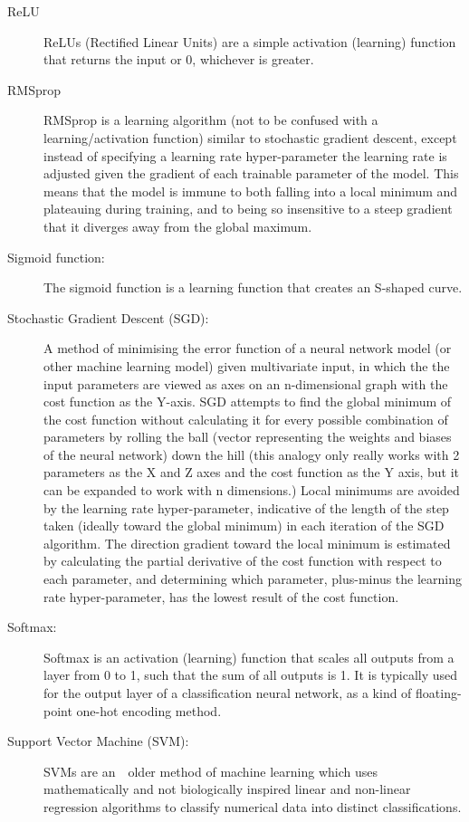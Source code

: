 \documentclass[]{report}
\begin{document}
\begin{description}
\item[ReLU] ReLUs (Rectified Linear Units) are a simple activation (learning) function that returns the input or 0, whichever is greater.

\item[RMSprop] RMSprop is a learning algorithm (not to be confused with a learning/activation function) similar to stochastic gradient descent, except instead of specifying a learning rate hyper-parameter the learning rate is adjusted given the gradient of each trainable parameter of the model. This means that the model is immune to both falling into a local minimum and plateauing during training, and to being so insensitive to a steep gradient that it diverges away from the global maximum.

\item[Sigmoid function:] The sigmoid function is a learning function that creates an S-shaped curve.

\label{itm:SGD}
\item[Stochastic Gradient Descent (SGD):] A method of minimising the error function of a neural network model (or other machine learning model) given multivariate input, in which the the input parameters are viewed as axes on an n-dimensional graph with the cost function as the Y-axis. SGD attempts to find the global minimum of the cost function without calculating it for every possible combination of parameters by rolling the ball (vector representing the weights and biases of the neural network) down the hill (this analogy only really works with 2 parameters as the X and Z axes and the cost function as the Y axis, but it can be expanded to work with n dimensions.) Local minimums are avoided by the learning rate hyper-parameter, indicative of the length of the step taken (ideally toward the global minimum) in each iteration of the SGD algorithm. The direction gradient toward the local minimum is estimated by calculating the partial derivative of the cost function with respect to each parameter, and determining which parameter, plus-minus the learning rate hyper-parameter, has the lowest result of the cost function.

\item[Softmax:] Softmax is an activation (learning) function that scales all outputs from a layer from 0 to 1, such that the sum of all outputs is 1. It is typically used for the output layer of a classification neural network, as a kind of floating-point one-hot encoding method.

\item[Support Vector Machine (SVM):] SVMs are an　older method of machine learning which uses mathematically and not biologically inspired linear and non-linear regression algorithms to classify numerical data into distinct classifications.
\end{description}
\onecolumn

\printbibliography
\end{document}
